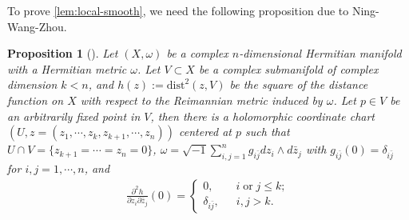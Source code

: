 \documentclass[12pt,reqno]{amsart}
\newtheorem{prop}{Proposition}[section]
\begin{document}
	
	To prove \cref{lem:local-smooth}, we need the following proposition due to Ning-Wang-Zhou.
	\begin{prop}[{\cite[Proposition 2.1]{NWZ24}}]\label{prop:hessian}Let $(X,\omega)$ be a complex $n$-dimensional  Hermitian manifold with a Hermitian metric $\omega$. Let $V\subset X$ be a complex submanifold of complex dimension $k<n$, and $h(z):=\mbox{dist}^2(z, V)$ be the square of the distance function  on $X$ with respect to the Reimannian metric induced by $\omega$.   Let $p\in V$ be an arbitrarily fixed point in $V$, then there is a holomorphic coordinate chart  $(U,z=(z_1,\cdots,z_k,z_{k+1},\cdots, z_n))$ centered at $p$ such that $U\cap V=\{z_{k+1}=\cdots=z_n=0\}$, $\omega=\sqrt{-1}\sum_{i,j=1}^ng_{i\bar j}dz_i\wedge d\bar z_j$ with $g_{i\bar j}(0)=\delta_{i\bar j}$ for $i,j=1,\cdots, n$, and
		\begin{align*}
			\frac{\partial^2h}{\partial z_i\partial \bar z_j}(0)=
			\begin{cases}
				0, \quad\quad i \; \text{or} \; j\leq k; \\
				\delta_{i\bar j}, \quad\;\  i,j>k.
			\end{cases}
		\end{align*}
	\end{prop}
\end{document}
